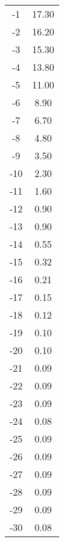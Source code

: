\begin{table}
\begin{tabular}[t]{S S}
        -1 & 17.30  \\
        -2 & 16.20  \\
        -3 & 15.30  \\
        -4 & 13.80  \\
        -5 & 11.00  \\
        -6 & 8.90   \\
        -7 & 6.70   \\
        -8 & 4.80   \\
        -9 & 3.50   \\
        -10 & 2.30  \\
        -11 & 1.60  \\
        -12 & 0.90  \\
        -13 & 0.90  \\
        -14 & 0.55  \\
        -15 & 0.32  \\
        -16 & 0.21  \\
        -17 & 0.15  \\
        -18 & 0.12  \\
        -19 & 0.10  \\
        -20 & 0.10  \\
        -21 & 0.09  \\
        -22 & 0.09  \\
        -23 & 0.09  \\
        -24 & 0.08  \\
        -25 & 0.09  \\
        -26 & 0.09  \\
        -27 & 0.09  \\
        -28 & 0.09  \\
        -29 & 0.09  \\
        -30 & 0.08  \\

        \bottomrule

    \end{tabular}
\end{table}


